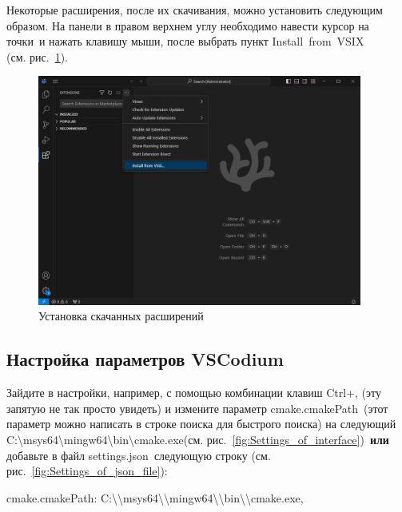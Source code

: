 \documentclass[a4paper,12pt]{article}
\begin{document}
Некоторые расширения, после их скачивания, можно установить следующим образом. На панели в правом верхнем углу необходимо навести курсор на  точки\textquotedbl \ и нажать клавишу мыши, после выбрать пункт \textquotedbl Install~from~VSIX\textquotedbl \\ (см. рис.~\ref{fig:installing_downloaded_extensions}).



\begin{figure}[H]
	\centering
	\includegraphics[width=0.95\textwidth]{images/Installing_downloaded_extensions.png}
	\caption {Установка скачанных расширений}
	\label{fig:installing_downloaded_extensions}
\end{figure}


\subsection{ Настройка параметров VSCodium}

Зайдите в настройки, например, с помощью комбинации клавиш Ctrl+, (эту запятую не так просто увидеть) и измените параметр \textquotedbl cmake.cmakePath\textquotedbl \ (этот параметр можно написать в строке поиска для быстрого поиска) на следующий \textquotedbl C:\textbackslash msys64\textbackslash mingw64\textbackslash bin\textbackslash cmake.exe\textquotedbl (см. рис.~\ref{fig:Settings_of_interface})\ \textbf{или} добавьте в файл \textquotedbl settings.json\textquotedbl \ следующую строку (см. рис.~\ref{fig:Settings_of_json_file}):

\textquotedbl cmake.cmakePath\textquotedbl: \textquotedbl C:\textbackslash\textbackslash msys64\textbackslash\textbackslash mingw64\textbackslash\textbackslash bin\textbackslash\textbackslash cmake.exe\textquotedbl,
\end{document}
